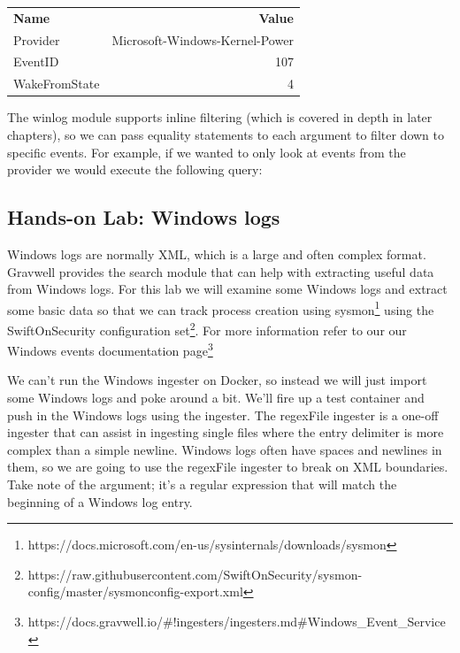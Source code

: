 \begin{longtable}[]{lr}
\toprule
\endhead
\textbf{Name} & \textbf{Value} \\
{Provider} & {Microsoft-Windows-Kernel-Power} \\
{EventID} & {107} \\
{WakeFromState} & {4} \\
\bottomrule
\end{longtable}

The winlog module supports inline filtering (which is covered in depth
in later chapters), so we can pass equality statements to each argument to
filter down to specific events. For example, if we wanted to only look
at events from the  provider we would
execute the following query:


\subsection{Hands-on Lab: Windows logs}

Windows logs are normally XML, which is a large and often complex
format. Gravwell provides the  search module that can help
with extracting useful data from Windows logs. For this lab we will
examine some Windows logs and extract some basic data so that we can
track process creation using
sysmon\footnote{https://docs.microsoft.com/en-us/sysinternals/downloads/sysmon} using the
SwiftOnSecurity configuration
set\footnote{https://raw.githubusercontent.com/SwiftOnSecurity/sysmon-config/master/sysmonconfig-export.xml}. For more information refer to our our Windows events documentation
page\footnote{https://docs.gravwell.io/\#!ingesters/ingesters.md\#Windows\_Event\_Service}

We can't run the Windows ingester on Docker, so instead we will just
import some Windows logs and poke around a bit. We'll fire up a test
container and push in the Windows logs using the  ingester.
The regexFile ingester is a one-off ingester that can assist in
ingesting single files where the entry delimiter is more complex than a simple newline.
Windows logs often have spaces and newlines in them, so we are going to use
the regexFile ingester to break on XML boundaries. Take note of the
 argument; it's a regular expression that will match the
beginning of a Windows log entry.


